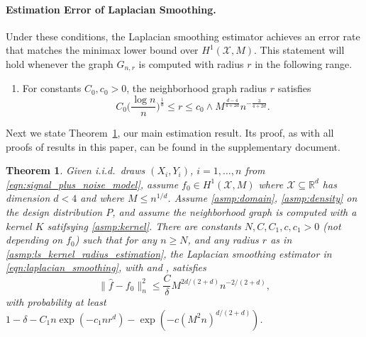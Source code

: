 \documentclass[twoside]{article}
\newcommand{\Reals}{\mathbb{R}}
\newcommand{\1}{\mathbf{1}}
\newcommand{\Rd}{\Reals^d}
\newcommand{\Xset}{\mathcal{X}}
\newcommand{\wh}[1]{\widehat{#1}}
\newtheorem{theorem}{Theorem}
\theoremstyle{definition}
\theoremstyle{remark}
\begin{document}
\paragraph{Estimation Error of Laplacian Smoothing.} 

Under these conditions, the Laplacian smoothing estimator \smash{$\wh{f}$} achieves an error rate that matches the minimax lower bound over $H^1(\Xset,M)$. This statement will hold whenever the graph $G_{n,r}$ is computed with radius $r$ in the following range.
\begin{enumerate}[label=(R\arabic*)]
	\setcounter{enumi}{0}
	\item 
	\label{asmp:ls_kernel_radius_estimation}
	For constants $C_0,c_0>0$, the neighborhood graph radius $r$ satisfies
	\begin{equation*}
    C_0 \biggl(\frac{\log n}{n}\biggr)^{\frac{1}{d}} \leq r \leq c_0 \wedge M^{\frac{d - 4}{4 + 2d}} n^{-\frac{3}{4 + 2d}}.  
	\end{equation*}
\end{enumerate}

Next we state Theorem~\ref{thm:laplacian_smoothing_estimation1}, our main estimation result. Its proof, as with all proofs of results in this paper, can be found in the supplementary document. 
\begin{theorem}
	\label{thm:laplacian_smoothing_estimation1}
  Given i.i.d.\ draws $(X_i,Y_i)$, $i=1,\ldots,n$ from \eqref{eqn:signal_plus_noise_model}, assume $f_0 \in H^1(\Xset,M)$ where $\Xset \subseteq \Rd$ has dimension $d < 4$ and where $M \leq n^{1/d}$. Assume \ref{asmp:domain}, \ref{asmp:density} on the design distribution $P$, and assume the neighborhood graph  is computed with a kernel $K$ satifsying \ref{asmp:kernel}. There are constants $N,C,C_1,c,c_1>0$ (not depending on $f_0$) such that for any $n \geq N$, and any radius $r$ as in \ref{asmp:ls_kernel_radius_estimation}, the Laplacian smoothing estimator \smash{$\wh{f}$} in \eqref{eqn:laplacian_smoothing}, with  and , satisfies
	\begin{equation}
	\label{eqn:laplacian_smoothing_estimation1}
	\bigl\|\wh{f} - f_0\bigr\|_n^2 \leq \frac{C}{\delta} M^{2d/(2 + d)} n^{-2/(2 + d)},
	\end{equation}
  with probability at least $1 - \delta -  C_1n\exp(-c_1nr^d) - \exp(-c (M^2n)^{d/(2 + d)})$.
\end{theorem}
\end{document}
